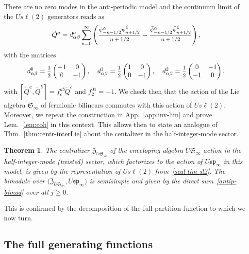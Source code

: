 \documentclass[11pt]{article}
\newcommand{\ffrac}[2]{\mbox{\footnotesize$\displaystyle\frac{#1}{#2}$}}
\newcommand{\half}{%
  \mathchoice{\ffrac{1}{2}}{\frac{1}{2}}{\frac{1}{2}}{\frac{1}{2}}}
\newcommand{\interLie}{\mathfrak{S}}
\newcommand{\spinf}{\ssp_{\infty}}
\newcommand{\interinfin}{\interLie_{\infty}}
\newcommand{\SU}{s\ell}
\newcommand{\ssp}{\mathfrak{sp}}
\newcommand{\cent}{\mathfrak{Z}}
\newtheorem{thm}[subsubsection]{Theorem}
\theoremstyle{definition}
\begin{document}
There are no zero modes in the anti-periodic model and the continuum limit of the $U \SU(2)$ generators reads as~\cite{GRS1}
%
\begin{equation}\label{scal-lim-sl2}
\tilde{Q}^a=d^a_{\alpha\beta}\sum_{n=0}^\infty
\left(\ffrac{\psi^\alpha_{-n-1/2}\psi^\beta_{n+1/2}}{n+1/2} - \ffrac{\bar{\psi}^\alpha_{-n-1/2}\bar{\psi}^\beta_{n+1/2}}{n+1/2}\right),
\end{equation}
%
with the matrices
%
\begin{equation}\label{da-mat}
d^0_{\alpha\beta}=
\half
\begin{pmatrix}
-1 & 0\\
0 & -1
\end{pmatrix}, \quad
d^1_{\alpha\beta}=
\half
\begin{pmatrix}
1&0\\
0&-1
\end{pmatrix}, \quad
d^2_{\alpha\beta}=
\half
\begin{pmatrix}
0&-1\\
-1&0\end{pmatrix},
\end{equation}
%
with $[\tilde{Q}^a,\tilde{Q}^b]=f^{ab}_c\tilde{Q}^c$ and $f^{01}_2=-1$.
We check then  that the action of the Lie algebra $\interinfin$ of  fermionic bilinears commutes with this  action of $U \SU(2)$. Moreover, we repeat the construction in App.~\ref{app:inv-lim} and prove Lem.~\ref{lem:coh} in this context. This allows then to state  an analogue of  Thm.~\ref{thm:centr-interLie} about the centalizer in the half-integer-mode sector.


\begin{thm}\label{prop:interch-centr-tw}
The centralizer $\cent_{U\interinfin}$ of the enveloping algebra $U\interinfin$ action
in the half-integer-mode (twisted) sector, which factorizes to the action of $U\spinf$ in this model,
 is given by the representation of $U \SU(2)$ from~\eqref{scal-lim-sl2}. The bimodule over $\bigl(\cent_{U\interinfin},U\spinf\bigr)$  is semisimple and given by the direct sum~\eqref{antip-bimod} over all $j\geq0$.
\end{thm}

This is confirmed by the  decomposition of  the full partition function to which we now turn.

\subsection{The full generating functions}\label{sec:gen-func}
\end{document}
